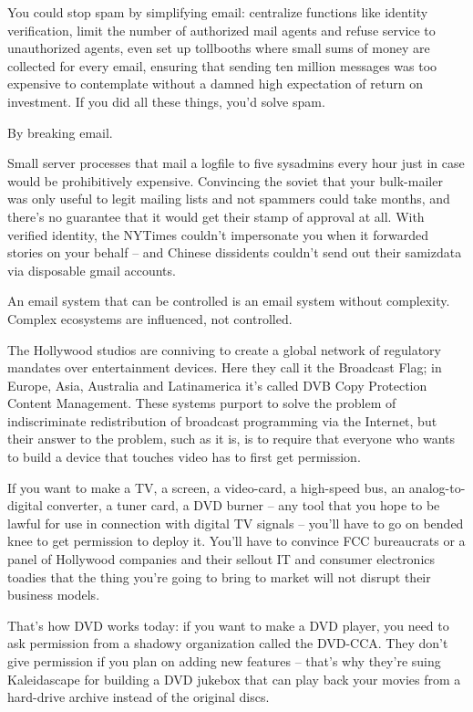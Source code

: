 You could stop spam by simplifying email: centralize functions like
identity verification, limit the number of authorized mail agents
and refuse service to unauthorized agents, even set up tollbooths
where small sums of money are collected for every email, ensuring
that sending ten million messages was too expensive to contemplate
without a damned high expectation of return on investment. If you
did all these things, you'd solve spam.

By breaking email.

Small server processes that mail a logfile to five sysadmins every
hour just in case would be prohibitively expensive. Convincing the
soviet that your bulk-mailer was only useful to legit mailing lists
and not spammers could take months, and there's no guarantee that
it would get their stamp of approval at all. With verified
identity, the NYTimes couldn't impersonate you when it forwarded
stories on your behalf -- and Chinese dissidents couldn't send out
their samizdata via disposable gmail accounts.

An email system that can be controlled is an email system without
complexity. Complex ecosystems are influenced, not controlled.

The Hollywood studios are conniving to create a global network of
regulatory mandates over entertainment devices. Here they call it
the Broadcast Flag; in Europe, Asia, Australia and Latinamerica
it's called DVB Copy Protection Content Management. These systems
purport to solve the problem of indiscriminate redistribution of
broadcast programming via the Internet, but their answer to the
problem, such as it is, is to require that everyone who wants to
build a device that touches video has to first get permission.

If you want to make a TV, a screen, a video-card, a high-speed bus,
an analog-to-digital converter, a tuner card, a DVD burner -- any
tool that you hope to be lawful for use in connection with digital
TV signals -- you'll have to go on bended knee to get permission to
deploy it. You'll have to convince FCC bureaucrats or a panel of
Hollywood companies and their sellout IT and consumer electronics
toadies that the thing you're going to bring to market will not
disrupt their business models.

That's how DVD works today: if you want to make a DVD player, you
need to ask permission from a shadowy organization called the
DVD-CCA. They don't give permission if you plan on adding new
features -- that's why they're suing Kaleidascape for building a
DVD jukebox that can play back your movies from a hard-drive
archive instead of the original discs.

